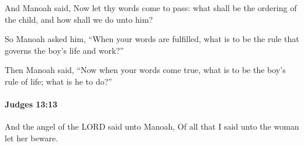 			\begin{versebox}
					\item[BHS] 
					\item[ASV] And Manoah said, Now let thy words come to pass: what shall be the ordering of the child, and how shall we do unto him?
					\item[NIV] So Manoah asked him, “When your words are fulfilled, what is to be the rule that governs the boy’s life and work?”
					\item[NRSV] Then Manoah said, “Now when your words come true, what is to be the boy’s rule of life; what is he to do?”
			\end{versebox}

		\paragraph{Judges 13:13} %
			\label{JUDGES-13-13}

			And the angel of the LORD said unto Manoah, Of all that I said unto the woman let her beware.

